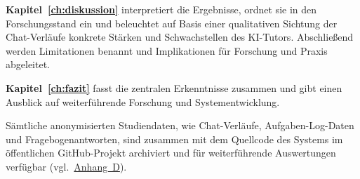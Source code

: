 \textbf{Kapitel~\ref{ch:diskussion}} interpretiert die Ergebnisse, ordnet sie in den Forschungsstand ein und beleuchtet auf Basis einer qualitativen Sichtung der Chat-Verläufe konkrete Stärken und Schwachstellen des KI-Tutors. Abschließend werden Limitationen benannt und Implikationen für Forschung und Praxis abgeleitet.

\textbf{Kapitel~\ref{ch:fazit}} fasst die zentralen Erkenntnisse zusammen und gibt einen Ausblick auf weiterführende Forschung und Systementwicklung.


Sämtliche anonymisierten Studiendaten, wie Chat-Verläufe, Aufgaben-Log-Daten und Fragebogenantworten, sind zusammen mit dem Quellcode des Systems im öffentlichen GitHub-Pro\-jekt archiviert und für weiterführende Auswertungen verfügbar (vgl.\ \hyperref[appendix:daten]{Anhang~D}).


